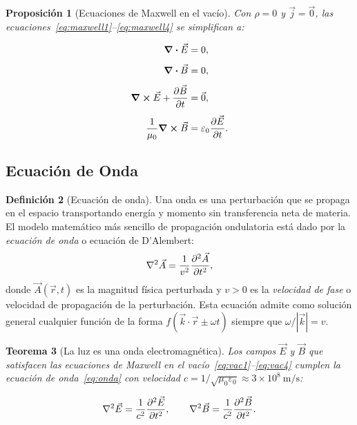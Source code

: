 \documentclass[12pt, a4paper]{article}
\theoremstyle{plain}
\newtheorem{teorema}{Teorema}[section]
\newtheorem{proposicion}[teorema]{Proposición}
\theoremstyle{definition}
\newtheorem{definicion}[teorema]{Definición}
\theoremstyle{remark}
\newcommand{\ve}[1]{\vec{#1}}
\begin{document}
\begin{proposicion}[Ecuaciones de Maxwell en el vacío]
Con $\rho=0$ y $\ve{j}=\ve{0}$, las
ecuaciones~\eqref{eq:maxwell1}--\eqref{eq:maxwell4} se simplifican a:
\begin{mdframed}[style=resultado,nobreak=true]
\begin{align}
  \div \ve{E} &= 0, \label{eq:vac1}\\[4pt]
  \div \ve{B} &= 0, \label{eq:vac2}\\[4pt]
  \curl \ve{E} + \pdv{\ve{B}}{t} &= \ve{0}, \label{eq:vac3}\\[4pt]
  \frac{1}{\mu_0}\curl \ve{B} &= \varepsilon_0 \pdv{\ve{E}}{t}. \label{eq:vac4}
\end{align}
\end{mdframed}
\end{proposicion}

\subsection{Ecuación de Onda}

\begin{definicion}[Ecuación de onda]
Una onda es una perturbación que se propaga en el espacio transportando energía
y momento sin transferencia neta de materia. El modelo matemático más sencillo
de propagación ondulatoria está dado por la \emph{ecuación de onda} o ecuación
de D'Alembert:
\begin{equation}
  \nabla^2\ve{A} = \frac{1}{v^2}\pdv[2]{\ve{A}}{t}, \label{eq:onda}
\end{equation}
donde $\ve{A}(\ve{r},t)$ es la magnitud física perturbada y $v > 0$ es la
\emph{velocidad de fase} o velocidad de propagación de la perturbación. Esta
ecuación admite como solución general cualquier función de la forma
$f(\ve{k}\cdot\ve{r} \pm \omega t)$ siempre que $\omega/|\ve{k}| = v$.
\end{definicion}

\begin{teorema}[La luz es una onda electromagnética]
Los campos $\ve{E}$ y $\ve{B}$ que satisfacen las ecuaciones de Maxwell en
el vacío~\eqref{eq:vac1}--\eqref{eq:vac4} cumplen la ecuación de
onda~\eqref{eq:onda} con velocidad $c = 1/\sqrt{\mu_0\varepsilon_0}
\approx 3\times10^8\ \mathrm{m/s}$:
\begin{mdframed}[style=resultado]
\begin{equation}
  \nabla^2\ve{E} = \frac{1}{c^2}\pdv[2]{\ve{E}}{t}, \qquad
  \nabla^2\ve{B} = \frac{1}{c^2}\pdv[2]{\ve{B}}{t}. \label{eq:ondaEM}
\end{equation}
\end{mdframed}
\end{teorema}
\end{document}
